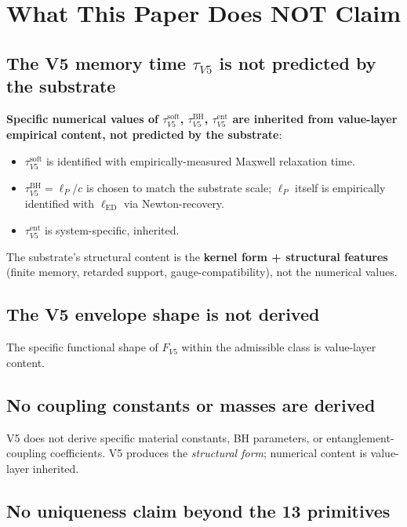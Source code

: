 \documentclass[11pt,a4paper]{article}
\begin{document}
\section{What This Paper Does NOT Claim}

\subsection{The V5 memory time $\tau_{V5}$ is not predicted by the substrate}

\textbf{Specific numerical values of $\tau_{V5}^\mathrm{soft}$, $\tau_{V5}^\mathrm{BH}$, $\tau_{V5}^\mathrm{ent}$ are inherited from value-layer empirical content, not predicted by the substrate}:

\begin{itemize}[noitemsep]
\item $\tau_{V5}^\mathrm{soft}$ is identified with empirically-measured Maxwell relaxation time.
\item $\tau_{V5}^\mathrm{BH} = \ell_P/c$ is chosen to match the substrate scale; $\ell_P$ itself is empirically identified with $\ell_\mathrm{ED}$ via Newton-recovery.
\item $\tau_{V5}^\mathrm{ent}$ is system-specific, inherited.
\end{itemize}

The substrate's structural content is the \textbf{kernel form + structural features} (finite memory, retarded support, gauge-compatibility), not the numerical values.

\subsection{The V5 envelope shape is not derived}

The specific functional shape of $F_{V5}$ within the admissible class is value-layer content.

\subsection{No coupling constants or masses are derived}

V5 does not derive specific material constants, BH parameters, or entanglement-coupling coefficients. V5 produces the \emph{structural form}; numerical content is value-layer inherited.

\subsection{No uniqueness claim beyond the 13 primitives}
\end{document}
